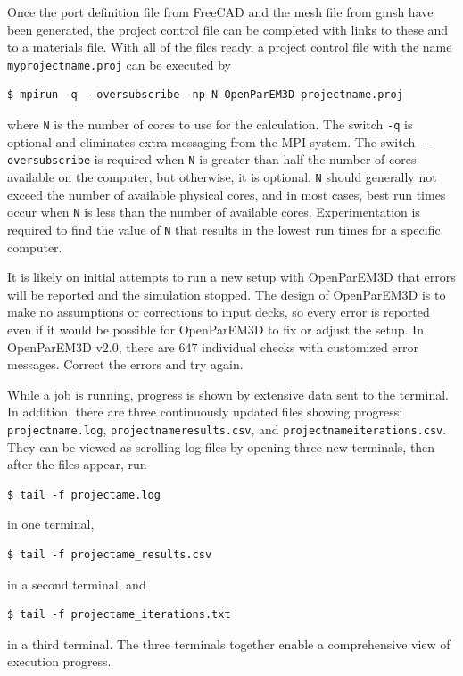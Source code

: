 \documentclass[titlepage]{article}
\renewcommand\_{\textunderscore\linebreak[1]}
\begin{document}
Once the port definition file from FreeCAD and the mesh file from gmsh have been generated, the project control file can be completed with links to these and to a materials file.  With all of the files ready, a project control file with the name \texttt{my\_projectname.proj} can be executed by 
\begin{Verbatim}[fontsize=\small]
   $ mpirun -q --oversubscribe -np N OpenParEM3D projectname.proj
\end{Verbatim}
where \verb+N+ is the number of cores to use for the calculation.  The switch \verb+-q+ is optional and eliminates extra messaging from the MPI system.  The switch \verb+--oversubscribe+ is required when \verb+N+ is greater than half the number of cores available on the computer, but otherwise, it is optional.  \verb+N+ should generally not exceed the number of available physical cores, and in most cases, best run times occur when \verb+N+ is less than the number of available cores.  Experimentation is required to find the value of \verb+N+ that results in the lowest run times for a specific computer.

It is likely on initial attempts to run a new setup with OpenParEM3D that errors will be reported and the simulation stopped.  The design of OpenParEM3D is to make no assumptions or corrections to input decks, so every error is reported even if it would be possible for OpenParEM3D to fix or adjust the setup.  In OpenParEM3D v2.0, there are 647 individual checks with customized error messages.  Correct the errors and try again.

While a job is running, progress is shown by extensive data sent to the terminal.  In addition,
there are three continuously updated files showing progress: \texttt{projectname.log}, \texttt{projectname\_results.csv}, and \texttt{projectname\_iterations.csv}.  They can be viewed as scrolling log files by opening three new terminals, then after the files appear, run
\begin{Verbatim}[fontsize=\small]
   $ tail -f projectame.log
\end{Verbatim}
\noindent in one terminal,
\begin{Verbatim}[fontsize=\small]
   $ tail -f projectame_results.csv
\end{Verbatim}
\noindent in a second terminal, and
\begin{Verbatim}[fontsize=\small]
   $ tail -f projectame_iterations.txt
\end{Verbatim}
\noindent in a third terminal.  The three terminals together enable a comprehensive view of execution progress.
\end{document}
